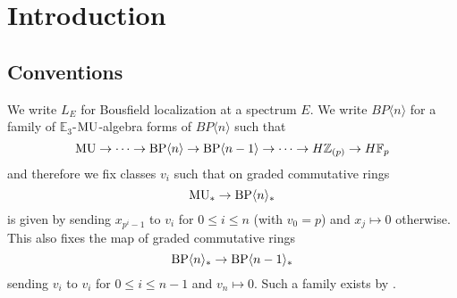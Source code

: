 
\section{Introduction}





\subsection{Conventions}
We write $L_{E}$ for Bousfield localization at a spectrum $E$. We write $BP\langle n\rangle$ for a family of $\mathbb{E}_{3}$-$\mathrm{MU}$-algebra forms of $BP\langle n\rangle$ such that 
\[\mathrm{MU} \to  \dots \to \mathrm{BP}\langle n\rangle\to  \mathrm{BP}\langle n-1\rangle\to  \dots  \to H\mathbb{Z}_{(p)}\to H\mathbb{F}_{p}\]
and therefore we fix classes $v_{i}$ such that on graded commutative rings
\[\mathrm{MU}_{*}\to  \mathrm{BP}\langle n\rangle_{*}\]
is given by sending $x_{p^{i}-1}$ to $v_{i}$ for $0\le i\le n$ (with $v_{0}=p$) and $x_{j}\mapsto 0$ otherwise. This also fixes the map of graded commutative rings 
\[  \mathrm{BP}\langle n\rangle_{*}\to  \mathrm{BP}\langle n-1\rangle_{*}\]
sending $v_{i}$ to $v_{i}$ for $0\le i\le n-1$ and $v_{n}\mapsto 0$. Such a family exists by \cite{HW22}. 
